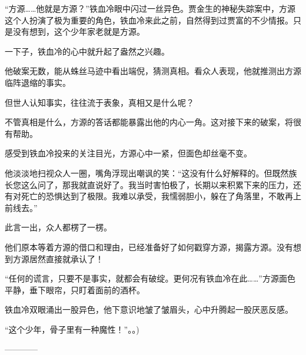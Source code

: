 \begin{this_body}
“方源……他就是方源？”铁血冷眼中闪过一丝异色。贾金生的神秘失踪案中，方源这个人扮演了极为重要的角色，铁血冷来此之前，自然得到过贾富的不少情报。只是没有想到，这个少年家老就是方源。

一下子，铁血冷的心中就升起了盎然之兴趣。

他破案无数，能从蛛丝马迹中看出端倪，猜测真相。看众人表现，他就推测出方源临阵退缩的事实。

但世人认知事实，往往流于表象，真相又是什么呢？

不管真相是什么，方源的答话都能暴露出他的内心一角。这对接下来的破案，将很有帮助。

感受到铁血冷投来的关注目光，方源心中一紧，但面色却丝毫不变。

他淡淡地扫视众人一圈，嘴角浮现出嘲讽的笑：“这没有什么好解释的。但既然族长您这么问了，那我就直说好了。我当时害怕极了，长期以来积累下来的压力，还有对死亡的恐惧达到了极限。我难以承受，我懦弱胆小，躲在了角落里，不敢再上前线去。”

此言一出，众人都楞了一楞。

他们原本等着方源的借口和理由，已经准备好了如何戳穿方源，揭露方源。没有想到方源居然直接就承认了！

“任何的谎言，只要不是事实，就都会有破绽。更何况有铁血冷在此……”方源面色平静，垂下眼帘，只盯着面前的酒杯。

铁血冷双眼涌出一股异色，他下意识地皱了皱眉头，心中升腾起一股厌恶反感。

“这个少年，骨子里有一种魔性！”。。)

------------

\end{this_body}

